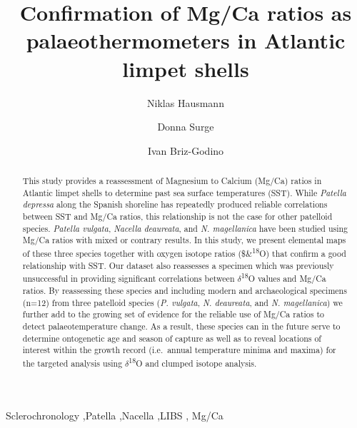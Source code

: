 \documentclass[
  authoryear,
  preprint,
  3p]{elsarticle}
\begin{document}
\begin{frontmatter}
\title{Confirmation of Mg/Ca ratios as palaeothermometers in Atlantic
limpet shells}
\author[1]{Niklas Hausmann%
%
}
\author[2]{Donna Surge%
%
}

\author[3]{Ivan Briz-Godino%
%
}






        
\begin{abstract}
This study provides a reassessment of Magnesium to Calcium (Mg/Ca)
ratios in Atlantic limpet shells to determine past sea surface
temperatures (SST). While \emph{Patella depressa} along the Spanish
shoreline has repeatedly produced reliable correlations between SST and
Mg/Ca ratios, this relationship is not the case for other patelloid
species. \emph{Patella vulgata}, \emph{Nacella deaureata}, and \emph{N.
magellanica} have been studied using Mg/Ca ratios with mixed or contrary
results. In this study, we present elemental maps of these three species
together with oxygen isotope ratios (\$\delta\&\textsuperscript{18}O)
that confirm a good relationship with SST. Our dataset also reassesses a
specimen which was previously unsuccessful in providing significant
correlations between \(\delta\)\textsuperscript{18}O values and Mg/Ca
ratios. By reassessing these species and including modern and
archaeological specimens (n=12) from three patelloid species (\emph{P.
vulgata}, \emph{N. deaureata}, and \emph{N. magellanica}) we further add
to the growing set of evidence for the reliable use of Mg/Ca ratios to
detect palaeotemperature change. As a result, these species can in the
future serve to determine ontogenetic age and season of capture as well
as to reveal locations of interest within the growth record (i.e.~annual
temperature minima and maxima) for the targeted analysis using
\(\delta\)\textsuperscript{18}O and clumped isotope analysis.
\end{abstract}





\begin{keyword}
    Sclerochronology \sep Patella \sep Nacella \sep LIBS \sep 
    Mg/Ca
\end{keyword}
\end{frontmatter}
    
\end{document}
